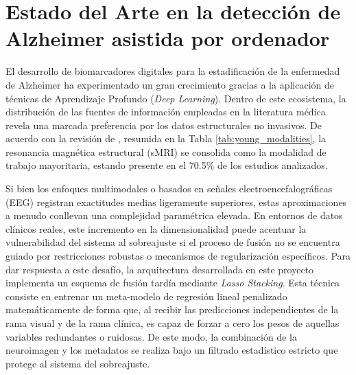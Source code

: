\documentclass[12pt, oneside, english, spanish]{book}
\begin{document}
\section{Estado del Arte en la detección de Alzheimer asistida por ordenador} \label{sec:sota_alzheimer}

El desarrollo de biomarcadores digitales para la estadificación de la enfermedad de Alzheimer ha experimentado un gran crecimiento gracias a la aplicación de técnicas de Aprendizaje Profundo (\textit{Deep Learning}). Dentro de este ecosistema, la distribución de las fuentes de información empleadas en la literatura médica revela una marcada preferencia por los datos estructurales no invasivos. De acuerdo con la revisión de \cite{young2025}, resumida en la Tabla \ref{tab:young_modalities}, la resonancia magnética estructural (sMRI) se consolida como la modalidad de trabajo mayoritaria, estando presente en el 70.5\% de los estudios analizados. 

Si bien los enfoques multimodales o basados en señales electroencefalográficas (EEG) registran exactitudes medias ligeramente superiores, estas aproximaciones a menudo conllevan una complejidad paramétrica elevada. En entornos de datos clínicos reales, este incremento en la dimensionalidad puede acentuar la vulnerabilidad del sistema al sobreajuste si el proceso de fusión no se encuentra guiado por restricciones robustas o mecanismos de regularización específicos. Para dar respuesta a este desafío, la arquitectura desarrollada en este proyecto implementa un esquema de fusión tardía mediante \textit{Lasso Stacking}. Esta técnica consiste en entrenar un meta-modelo de regresión lineal penalizado matemáticamente de forma que, al recibir las predicciones independientes de la rama visual y de la rama clínica, es capaz de forzar a cero los pesos de aquellas variables redundantes o ruidosas. De este modo, la combinación de la neuroimagen y los metadatos se realiza bajo un filtrado estadístico estricto que protege al sistema del sobreajuste.
\end{document}
